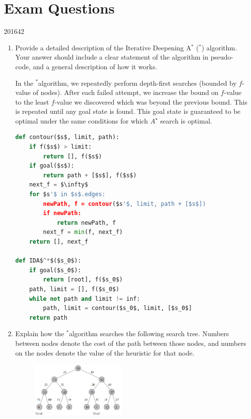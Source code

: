 \documentclass[10pt,\jkfside,a4paper]{article}
\newcommand{\idastar}{\text{IDA}\ensuremath{^*}}
\newcommand{\astar}{\ensuremath{A^\star}}
\begin{document}
\part{Exam Questions}

\setcounter{section}{0}

\begin{examquestion}{2016}{4}{2}

\begin{enumerate}[label=(\alph*)]

\item Provide a detailed description of the Iterative Deepening A$^*$
(\idastar) algorithm. Your answer should include a clear statement of the
algorithm in pseudo-code, and a general description of how it works.

In the \idastar algorithm, we repeatedly perform depth-first searches
(bounded by $f$-value of nodes). After each failed attempt, we increase the
bound on $f$-value to the least $f$-value we discovered which was beyond the
previous bound. This is repeated until any goal state is found. This goal
state is guaranteed to be optimal under the same conditions for which \astar
search is optimal.

\begin{lstlisting}[language=Python, mathescape=true]
def contour($s$, limit, path):
	if f($s$) > limit:
		return [], f($s$)
	if goal($s$):
		return path + [$s$], f($s$)
	next_f = $\infty$
	for $s'$ in $s$.edges:
		newPath, f = contour($s'$, limit, path + [$s$])
		if newPath:
			return newPath, f
		next_f = min(f, next_f)
	return [], next_f

def IDA$^*$($s_0$):
	if goal($s_0$):
		return [root], f($s_0$)
	path, limit = [], f($s_0$)
	while not path and limit != inf:
		path, limit = contour($s_0$, limit, [$s_0$]
	return path
\end{lstlisting}

\item Explain how the \idastar algorithm searches the following search tree.
Numbers between nodes denote the cost of the path between those nodes, and
numbers on the nodes denote the value of the heuristic for that node.

\begin{figure}[H]
\centering
\includegraphics[width=0.45\textwidth]{searchtree}
\end{figure}


\end{enumerate}
\end{examquestion}
\end{document}
